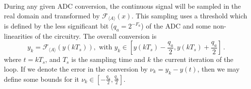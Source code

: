 \documentclass[sigconf]{llncs}
\newcommand{\mat}[1]{{#1}}
\renewcommand{\vec}[1]{{#1}}
\begin{document}
%

During any given ADC conversion, the continuous signal will be sampled in
the real domain and transformed by $\mathcal{F}_{\langle A \rangle}
(x)$. This sampling uses a threshold which is defined by the
less significant bit ($q_{a}=2^{-F_a}$) 
of the ADC and some non-linearities of the circuitry.  The overall conversion is
%
$$\vec{y}_k=\mathcal{F}_{\langle A \rangle}\left(y(kT_s)\right), \text{ with }  \vec{y}_k \in \left[y(kT_s)-\frac{q_{a}}{2}, y(kT_s)+\frac{q_{a}}{2}\right] \,.$$
%
where $t = kT_s$, and $T_s$ is the sampling time and $k$ the current iteration of the loop.
If we denote the error in the conversion by $\nu_k=y_k-y(t)$, then we may define
some bounds for it $\nu_k \in [-\frac{q_{a}}{2}, \frac{q_{a}}{2}]$.
\end{document}
